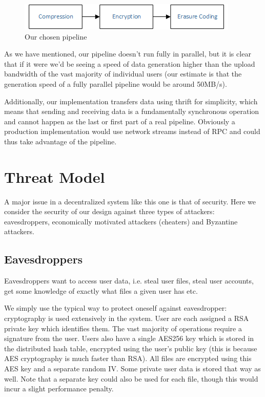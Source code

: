 \documentclass[11pt]{IEEEtran}
\begin{document}
\begin{figure}
\centering
\includegraphics[scale=0.8]{flow1.png}
\caption{Our chosen pipeline}
\end{figure}

As we have mentioned, our pipeline doesn't run fully in parallel, but it is clear that if it were we'd be seeing a speed of data generation higher than the upload bandwidth of the vast majority of individual users (our estimate is that the generation speed of a fully parallel pipeline would be around 50MB/s).

Additionally, our implementation transfers data using thrift for simplicity, which means that sending and receiving data is a fundamentally synchronous operation and cannot happen as the last or first part of a real pipeline. Obviously a production implementation would use network streams instead of RPC and could thus take advantage of the pipeline.

\section{Threat Model}

A major issue in a decentralized system like this one is that of security. Here we consider the security of our design against three types of attackers: eavesdroppers, economically motivated attackers (cheaters) and Byzantine attackers.

\subsection{Eavesdroppers}

Eavesdroppers want to access user data, i.e. steal user files, steal user accounts, get some knowledge of exactly what files a given user has etc.

We simply use the typical way to protect oneself against eavesdropper: cryptography is used extensively in the system. User are each assigned a RSA private key which identifies them. The vast majority of operations require a signature from the user. Users also have a single AES256 key which is stored in the distributed hash table, encrypted using the user's public key (this is because AES cryptography is much faster than RSA). All files are encrypted using this AES key and a separate random IV. Some private user data is stored that way as well. Note that a separate key could also be used for each file, though this would incur a slight performance penalty.
\end{document}
